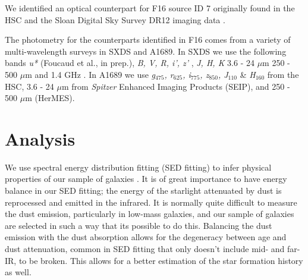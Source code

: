 \documentclass[preprint,natbib209]{aastex}
\begin{document}
We identified an optical counterpart for F16 source ID 7 originally found in the HSC and the Sloan Digital Sky Survey \citep[SDSS;][]{york2000} 
DR12 \citep{alam15} imaging data \citep{fukugita96, gunn98, hogg01, smith02, pier03, ivezic04, gunn06, tucker06, padmanabhan08, doi10}.

The photometry for the counterparts identified in F16 comes from a variety of multi-wavelength surveys in SXDS and A1689.
In SXDS we use the following bands \textit{u*} (Foucaud et al., in prep.), \textit{B, V, R, i', z'} \citep{furusawa08},
\textit{J, H, K} \citep[UKIDSS;\footnotemark][]{lawrence07} 3.6 - 24 $\mu$m \citep[SWIRE, SpUDS, SEDS;][]{lonsdale03, ashby13}
250 - 500 $\mu$m \citep[HerMES;][]{oliver12, smith12, wang14} and 1.4 GHz \citep{simpson06}.
In A1689 we use \textit{g$_{475}$, r$_{625}$, i$_{775}$, z$_{850}$, J$_{110}$} \& \textit{H}$_{160}$ from the HSC,
 3.6 - 24 $\mu$m from \textit{Spitzer} Enhanced Imaging Products (SEIP), and 250 - 500 $\mu$m (HerMES).


\section{Analysis}
\label{sec:analysis}

We use spectral energy distribution fitting (SED fitting) to infer physical properties of our sample of galaxies \citep[for a recent review of SED fitting see][]{conroy13}. It is of great importance to have energy balance in our SED fitting; the energy of the starlight attenuated by dust is reprocessed and emitted in the infrared. It is normally quite difficult to measure the dust emission, particularly in low-mass galaxies, and our sample of galaxies are selected in such a way that its possible to do this. Balancing the dust emission with the dust absorption allows for the degeneracy between age and dust attenuation, common in SED fitting that only doesn't include mid- and far-IR, to be broken. This allows for a better estimation of the star formation history as well.
\end{document}
